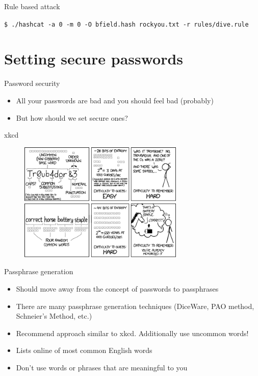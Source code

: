\documentclass[12pt,aspectratio=169]{beamer}
\renewcommand{\emph}[1]{{\color{mLightBrown}#1}}
\begin{document}
\begin{frame}{Rule based attack}
    \raggedright
    \lstinline|$ ./hashcat -a 0 -m 0 -O bfield.hash rockyou.txt -r rules/dive.rule|
\end{frame}

\section{Setting secure passwords}

\begin{frame}{Password security}
	\begin{itemize}
            \item All your passwords are bad and you should feel bad (probably)
            \item But how should we set secure ones?
	\end{itemize}
\end{frame}

\begin{frame}{xkcd}
    \begin{figure}[h]
        \includegraphics[width=0.7\textwidth]{xkcd.png}
    \end{figure}
\end{frame}

\begin{frame}{Passphrase generation}
    \begin{itemize}
        \item Should move away from the concept of passwords to \emph{passphrases}
        \item There are many passphrase generation techniques (DiceWare, PAO method, Schneier's Method, etc.)
        \item Recommend approach similar to xkcd. Additionally use uncommon words!
        \item Lists online of most common English words
        \item Don't use words or phrases that are meaningful to you
    \end{itemize}
\end{frame}
\end{document}

